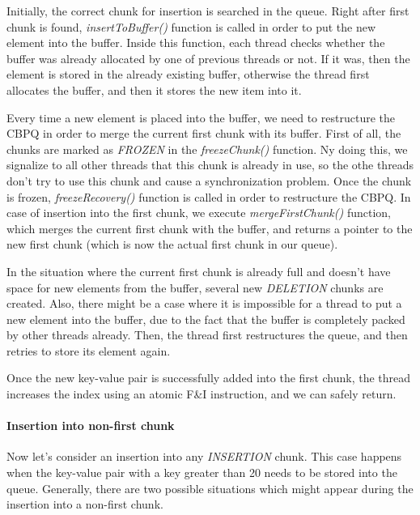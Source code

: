 \documentclass{article}
\begin{document}
Initially, the correct chunk for insertion is searched in the queue. Right after first chunk is found, \textit{insertToBuffer()} function is called in order to put the new element into the buffer. Inside this function, each thread checks whether the buffer was already allocated by one of previous threads or not. If it was, then the element is stored in the already existing buffer, otherwise the thread first allocates the buffer, and then it stores the new item into it.\par

Every time a new element is placed into the buffer, we need to restructure the CBPQ in order to merge the current first chunk with its buffer. First of all, the chunks are marked as \emph{FROZEN} in the \textit{freezeChunk()} function. Ny doing this, we signalize to all other threads that this chunk is already in use, so the othe threads don't try to use this chunk and cause a synchronization problem. Once the chunk is frozen, \textit{freezeRecovery()} function is called in order to restructure the CBPQ. In case of insertion into the first chunk, we execute \textit{mergeFirstChunk()} function, which merges the current first chunk with the buffer, and returns a pointer to the new first chunk (which is now the actual first chunk in our queue).\par

In the situation where the current first chunk is already full and doesn't have space for new elements from the buffer, several new \emph{DELETION} chunks are created. Also, there might be a case where it is impossible for a thread to put a new element into the buffer, due to the fact that the buffer is completely packed by other threads already. Then, the thread first restructures the queue, and then retries to store its element again.\par

Once the new key-value pair is successfully added into the first chunk, the thread increases the index using an atomic F\&I instruction, and we can safely return.

\paragraph{Insertion into non-first chunk}\mbox{}\par

Now let's consider an insertion into any \emph{INSERTION} chunk. This case happens when the key-value pair with a key greater than 20 needs to be stored into the queue. Generally, there are two possible situations which might appear during the insertion into a non-first chunk.\par
\end{document}
